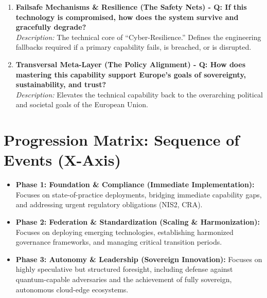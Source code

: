 \documentclass[12pt,a4paper]{report}
\begin{document}
\begin{enumerate}
    \item \textbf{Failsafe Mechanisms \& Resilience (The Safety Nets) - Q: If this technology is compromised, how does the system survive and gracefully degrade?}\\
    \textit{Description:} The technical core of ``Cyber-Resilience.'' Defines the engineering fallbacks required if a primary capability fails, is breached, or is disrupted.

    \item \textbf{Transversal Meta-Layer (The Policy Alignment) - Q: How does mastering this capability support Europe's goals of sovereignty, sustainability, and trust?}\\
    \textit{Description:} Elevates the technical capability back to the overarching political and societal goals of the European Union.
\end{enumerate}

\section{Progression Matrix: Sequence of Events (X-Axis)}

\begin{itemize}
    \item \textbf{Phase 1: Foundation \& Compliance (Immediate Implementation):} Focuses on state-of-practice deployments, bridging immediate capability gaps, and addressing urgent regulatory obligations (NIS2, CRA).
    \item \textbf{Phase 2: Federation \& Standardization (Scaling \& Harmonization):} Focuses on deploying emerging technologies, establishing harmonized governance frameworks, and managing critical transition periods.
    \item \textbf{Phase 3: Autonomy \& Leadership (Sovereign Innovation):} Focuses on highly speculative but structured foresight, including defense against quantum-capable adversaries and the achievement of fully sovereign, autonomous cloud-edge ecosystems.
\end{itemize}
\end{document}
